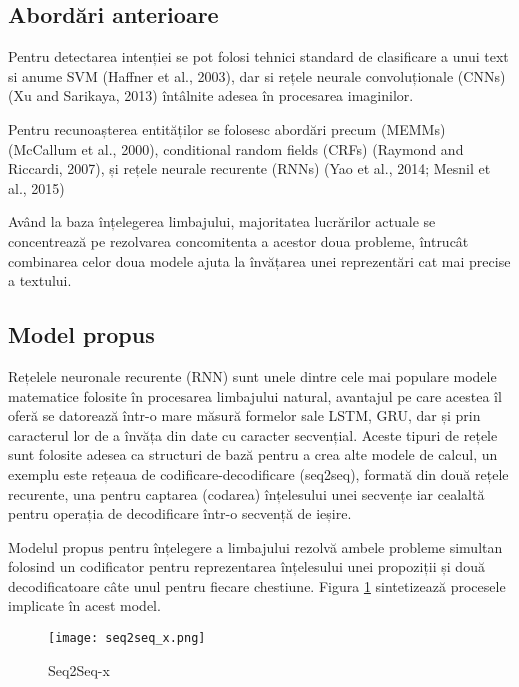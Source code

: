 \subsection{Abordări anterioare}


Pentru detectarea intenției se pot folosi tehnici standard de clasificare a unui text si anume SVM (Haffner et al., 2003), dar si rețele neurale convoluționale (CNNs) (Xu and Sarikaya, 2013) întâlnite adesea în procesarea imaginilor.

Pentru recunoașterea entităților se folosesc abordări precum (MEMMs) (McCallum et al., 2000), conditional random fields (CRFs) (Raymond and Riccardi, 2007), și rețele neurale recurente (RNNs) (Yao et al., 2014; Mesnil et al., 2015)

Având la baza înțelegerea limbajului, majoritatea lucrărilor actuale se concentrează pe rezolvarea concomitenta a acestor doua probleme, întrucât combinarea celor doua modele ajuta la învățarea unei reprezentări cat mai precise a textului. \cite{joint models-attention models}


\subsection{Model propus}

Rețelele neuronale recurente (RNN) sunt unele dintre cele mai populare modele matematice folosite în procesarea limbajului natural, avantajul pe care acestea îl oferă se datorează într-o mare măsură formelor sale LSTM, GRU, dar și prin caracterul lor de a învăța din date cu caracter secvențial. Aceste tipuri de rețele sunt folosite adesea ca structuri de bază pentru a crea alte modele de calcul, un exemplu este rețeaua de codificare-decodificare (seq2seq), formată din două rețele recurente, una pentru captarea (codarea) înțelesului unei secvențe iar cealaltă pentru operația de decodificare într-o secvență de ieșire.

Modelul propus pentru înțelegere a limbajului rezolvă ambele probleme simultan folosind un codificator pentru reprezentarea înțelesului unei propoziții și două decodificatoare câte unul pentru fiecare chestiune. Figura \ref{fig:seq2seq_x} sintetizează procesele implicate în acest model.

\begin{figure}[htbp]
	\centering
	\texttt{[image: seq2seq\_x.png]}
	\caption{Seq2Seq-x}
	\label{fig:seq2seq_x}
\end{figure}

